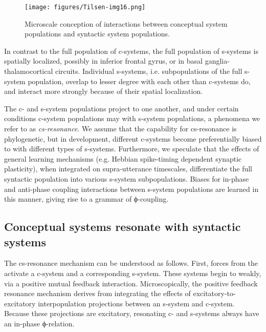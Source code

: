   
\begin{figure}
\texttt{[image: figures/Tilsen-img16.png]}
\caption{Microscale conception of interactions between conceptual system populations and syntactic system populations.}
\label{fig:2:9}
\end{figure}
 

  In contrast to the full population of c-systems, the full population of s-systems is spatially localized, possibly in inferior frontal gyrus, or in basal ganglia-thal\-a\-mo\-cor\-ti\-cal circuits. Individual s-systems, i.e. subpopulations of the full s-system population, overlap to lesser degree with each other than c-systems do, and interact more strongly because of their spatial localization. 

  The c- and s-system populations project to one another, and under certain conditions c-system populations may  with s-system populations, a phenomena we refer to as \textit{cs-resonance}. We assume that the capability for cs-resonance is phylogenetic, but in development, different c-systems become preferentially biased to  with different types of s-systems. Furthermore, we speculate that the effects of general learning mechanisms (e.g. Hebbian spike-timing dependent synaptic plasticity), when integrated on supra-utterance timescales, differentiate the full syntactic population into various s-system subpopulations. Biases for in-phase and anti-phase coupling interactions between s-system populations are learned in this manner, giving rise to a grammar of ϕ-coupling.

\subsection{Conceptual systems resonate with syntactic systems}

The cs-resonance mechanism can be understood as follows. First, forces from the  activate a c-system and a corresponding s-system. These systems begin to  weakly, via a positive mutual feedback interaction. Microscopically, the positive feedback resonance mechanism derives from integrating the effects of excitatory-to-excitatory interpopulation projections between an s-system and c-system. Because these projections are excitatory, resonating c- and s-systems always have an in-phase ϕ-relation. 

